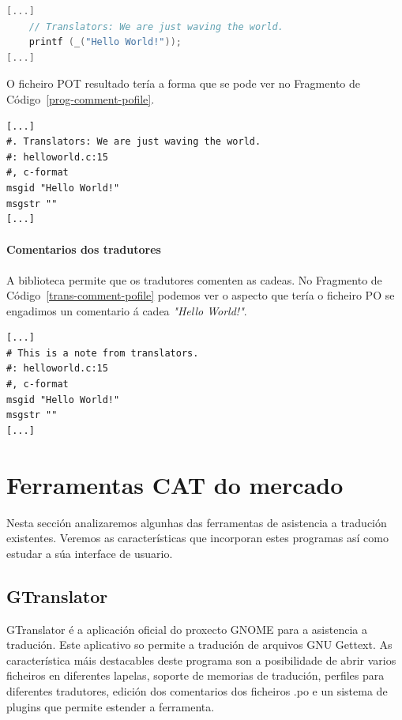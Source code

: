 \begin{lstlisting}[label=prog-comment-code,language=C,caption=Tradución con comentario.]
[...]
    // Translators: We are just waving the world.
    printf (_("Hello World!"));
[...]
\end{lstlisting}

O ficheiro POT resultado tería a forma que se pode ver no Fragmento de Código~\ref{prog-comment-pofile}.

\begin{lstlisting}[label=prog-comment-pofile,caption=Ficheiro POT con comentario.]
[...]
#. Translators: We are just waving the world.
#: helloworld.c:15
#, c-format
msgid "Hello World!"
msgstr ""
[...]
\end{lstlisting}


\paragraph{Comentarios dos tradutores}
A biblioteca permite que os tradutores comenten as cadeas. No Fragmento de Código~\ref{trans-comment-pofile} podemos ver o aspecto que tería o ficheiro PO se engadimos un comentario á cadea \emph{"Hello World!"}.

\begin{lstlisting}[label=trans-comment-pofile,caption=Ficheiro PO con comentario.]
[...]
# This is a note from translators.
#: helloworld.c:15
#, c-format
msgid "Hello World!"
msgstr ""
[...]
\end{lstlisting}

\section{Ferramentas CAT do mercado}
\label{sec:ferramentascat}
Nesta sección analizaremos algunhas das ferramentas de asistencia a tradución existentes. Veremos as características que incorporan estes programas así como estudar a súa interface de usuario.

\subsection{GTranslator}
GTranslator é a aplicación oficial do proxecto GNOME para a asistencia a tradución. Este aplicativo so permite a tradución de arquivos GNU Gettext. As característica máis destacables deste programa son a posibilidade de abrir varios ficheiros en diferentes lapelas, soporte de memorias de tradución, perfiles para diferentes tradutores, edición dos comentarios dos ficheiros .po e un sistema de plugins que permite estender a ferramenta.

